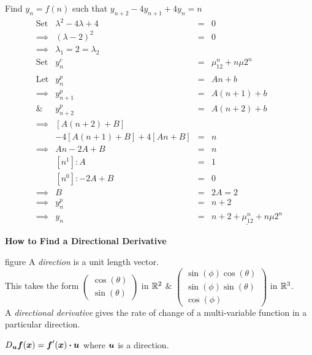 \documentclass[11pt,a4paper]{article}
\begin{document}
\newpage\subtitle{Example}
Find $y_n = f(n)$ such that $y_{n+2} -4y_{n+1} + 4y_n = n$\\
\[\begin{array}{rrcl}
\mathrm{Set}& \lambda^2 - 4\lambda + 4 &=&0\\
\implies& (\lambda - 2)^2 &=&0\\
\implies& \lambda_1 = 2 = \lambda_2\\
\mathrm{Set}& y_n^c &=& \mu_12^n + n\mu2^n\\
\\\mathrm{Let}& y_n^p &=& An + b\\
\implies&y_{n+1}^p &=& A(n+1) + b\\
\&&y_{n+2}^p &=& A(n+2) + b\\
\implies& [A(n+2)+B]\\&-4[A(n+1)+B]+4[An+B] &=& n\\
\implies& An - 2A +B&=&n\\
&[n^1] : A &=& 1\\
&[n^0] : -2A+B &=& 0\\
\implies& B &=& 2A = 2\\
\implies& y_n^p &=& n + 2\\
\implies& y_n &=& \underline{n+2+\mu_12^n + n\mu2^n}
\end{array}\]

\textbf{How to Find a Directional Derivative}\\

\subtitle{Theory}figure
A \textit{direction} is a unit length vector.\\
This takes the form $\begin{pmatrix} \cos(\theta) \\ \sin(\theta) \end{pmatrix}$ in $\mathbb{R}^2$ \& $\begin{pmatrix} \sin(\phi)\cos(\theta) \\ \sin(\phi)\sin(\theta) \\ \cos(\phi) \end{pmatrix}$ in $\mathbb{R}^3$.\\
A \textit{directional derivative} gives the rate of change of a multi-variable function in a particular direction.\\

\subtitle{Process}
\-\hspace{4ex}$D_{\boldsymbol{u}}\boldsymbol{f}(\boldsymbol{x}) = \boldsymbol{f}'(\boldsymbol{x}) \boldsymbol{\cdot} \boldsymbol{u}$ where $\boldsymbol{u}$ is a direction.\\
\end{document}
